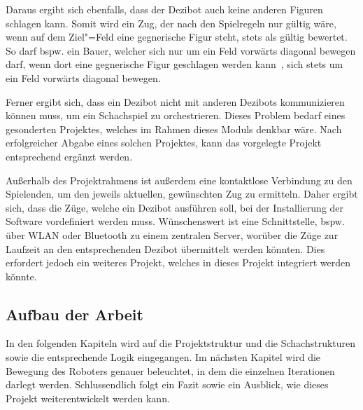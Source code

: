 
Daraus ergibt sich ebenfalls, dass der Dezibot auch keine anderen Figuren schlagen kann. Somit wird ein Zug, der nach den Spielregeln nur gültig wäre, wenn auf dem Ziel"=Feld eine gegnerische Figur steht, stets als gültig bewertet. So darf bspw. ein Bauer, welcher sich nur um ein Feld vorwärts diagonal bewegen darf, wenn dort eine gegnerische Figur geschlagen werden kann~\cite{justUSChessFederations2019}, sich stets um ein Feld vorwärts diagonal bewegen.


Ferner ergibt sich, dass ein Dezibot nicht mit anderen Dezibots kommunizieren können muss, um ein Schachspiel zu orchestrieren. Dieses Problem bedarf eines gesonderten Projektes, welches im Rahmen dieses Moduls denkbar wäre. Nach erfolgreicher Abgabe eines solchen Projektes, kann das vorgelegte Projekt entsprechend ergänzt werden.


Außerhalb des Projektrahmens ist außerdem eine kontaktlose Verbindung zu den Spielenden, um den jeweils aktuellen, gewünschten Zug zu ermitteln. Daher ergibt sich, dass die Züge, welche ein Dezibot ausführen soll, bei der Installierung der Software vordefiniert werden muss. Wünschenswert ist eine Schnittstelle, bspw. über WLAN oder Bluetooth zu einem zentralen Server, worüber die Züge zur Laufzeit an den entsprechenden Dezibot übermittelt werden könnten. Dies erfordert jedoch ein weiteres Projekt, welches in dieses Projekt integriert werden könnte.


\subsection{Aufbau der Arbeit}

In den folgenden Kapiteln wird auf die Projektstruktur und die Schachstrukturen sowie die entsprechende Logik eingegangen. Im nächsten Kapitel wird die Bewegung des Roboters genauer beleuchtet, in dem die einzelnen Iterationen darlegt werden. Schlussendlich folgt ein Fazit sowie ein Ausblick, wie dieses Projekt weiterentwickelt werden kann.
